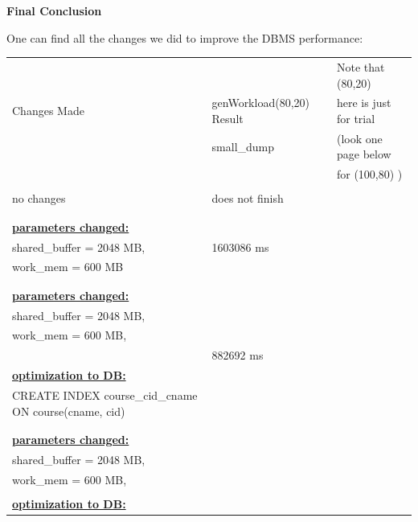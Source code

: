 \documentclass[10pt]{article}
\begin{document}
\begin{enumerate}
\begin{itemize}
			
			
		\end{itemize}
		
		
		
		\clearpage
		\textbf{Final Conclusion}
		
		
		
		One can find all the changes we did to improve the DBMS performance:
		
		\begin{table}[H]
			\centering
			\begin{tabular}{|P{9.7cm} | P{4.4cm} | p{3.5cm} |}
				\hline
				&&Note that (80,20)\\
				Changes Made & genWorkload(80,20) Result &   here is just for trial\\
				& small\_dump & (look one page below \\
				&& for (100,80) )\\
				\hline
				\hline
				&&\\
				no changes & does not finish & \\
				&&\\
				\hline
				\hline
				&&\\
				\textbf{\underline{parameters changed:}} & & \\
				shared\_buffer = 2048 MB, & 1603086 ms & \\
				work\_mem = 600 MB & & \\
				&&\\
				\hline
				\hline
				&&\\
				\textbf{\underline{parameters changed:}} & & \\
				shared\_buffer = 2048 MB, & & \\
				work\_mem = 600 MB, & & \\
				&882692 ms&\\
				\textbf{\underline{optimization to DB:}} & & \\
				CREATE INDEX course\_cid\_cname ON course(cname, cid) &&\\
				&&\\
				\hline
				\hline
				&&\\
				\textbf{\underline{parameters changed:}} & & \\
				shared\_buffer = 2048 MB, & & \\
				work\_mem = 600 MB, & & \\
				&&\\
				\textbf{\underline{optimization to DB:}} & & \\
				

\end{tabular}
\end{table}
\end{enumerate}
\end{document}
